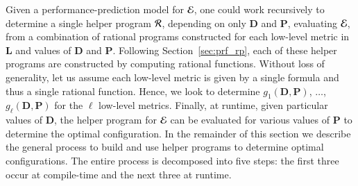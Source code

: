 Given a performance-prediction model for ${\cal E}$, 
one could work recursively to determine a 
single helper program ${\cal R}$, depending on only
$\bm{D}$ and $\bm{P}$, evaluating ${\cal E}$,
from a combination of rational programs constructed
for each low-level metric in $\bm{L}$
and values of $\bm{D}$ and $\bm{P}$.
Following Section~\ref{sec:prf_rp}, 
each of these helper programs are constructed by 
computing rational functions. Without loss of generality,
let us assume each low-level metric is given
by a single formula and thus a single rational function. 
Hence, we look to determine $g_1(\bm{D}, \bm{P})$,
$\ldots$, $g_{\ell}(\bm{D}, \bm{P})$ for the $\ell$ 
low-level metrics.
Finally, at runtime, given particular values of $\bm{D}$,
the helper program for ${\cal E}$ can be evaluated
for various values of $\bm{P}$ to determine
the optimal configuration.
%
%
In the remainder of this section we 
describe the general process to build
and use helper programs to determine 
optimal configurations.
The entire process is decomposed into five steps:
the first three occur at compile-time and the next three 
at runtime.

